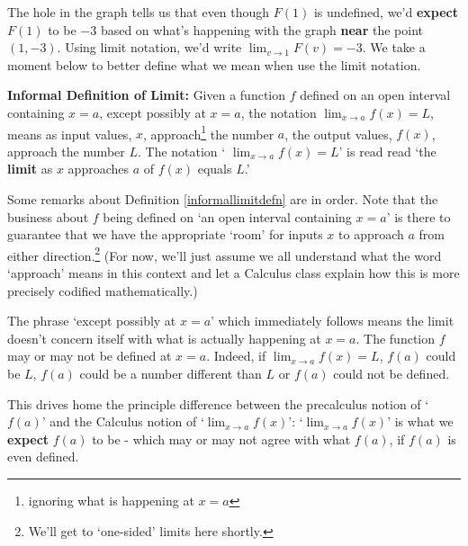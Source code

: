 \documentclass{ximera}
\begin{document}
The hole in the graph tells us that even though $F(1)$ is undefined, we'd \textbf{expect} $F(1)$ to be $-3$ based on what's happening with the graph \textbf{near} the point $(1,-3)$.  Using limit notation, we'd write  $\lim_{v \rightarrow 1} F(v) = -3$.  We take a moment below to better define what we mean when use the limit notation.




\begin{definition} \label{informallimitdefn} \textbf{Informal Definition of Limit:}  Given a function $f$ defined on an open interval containing $x=a$, except possibly at $x=a$, the notation $\lim_{x \rightarrow a} f(x) = L$, means as input values, $x$, approach\footnote{ignoring what is happening at $x=a$} the number $a$, the output values, $f(x)$, approach the number $L$.  The notation ` $\lim_{x \rightarrow a} f(x) = L$'  is read read `the \textbf{limit} as $x$ approaches $a$ of $f(x)$ equals $L$.' 
\end{definition}






Some remarks about Definition \ref{informallimitdefn} are in order.  Note that the business about $f$ being defined on `an open interval containing $x=a$'  is there to guarantee that we have the appropriate `room' for inputs $x$ to approach $a$ from either direction.\footnote{We'll get to `one-sided' limits here shortly.}  (For now, we'll just assume we all understand what the word `approach' means in this context and let a Calculus class explain how this is more precisely codified mathematically.)

 

The phrase  `except possibly at $x=a$' which immediately follows means the limit doesn't concern itself with what is actually happening at $x=a$.  The function  $f$ may or may not be defined at $x = a$.  Indeed,  if  $\lim_{x \rightarrow a} f(x) = L$, $f(a)$ could be $L$, $f(a)$  could be a number different than $L$ or $f(a)$ could not be defined. 



 This drives home the principle difference between the precalculus notion of `$f(a)$' and the Calculus notion of  `$\lim_{x \rightarrow a} f(x)$':  `$\lim_{x \rightarrow a} f(x)$' is what we \textbf{expect} $f(a)$ to be - which may or may not agree with what $f(a)$, if $f(a)$ is even defined. 
\end{document}
